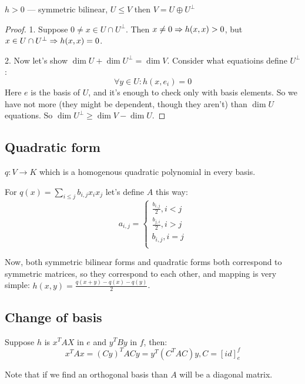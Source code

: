 \begin{thr}
    $h > 0$ --- symmetric bilinear, $U \le V$ then $V = U \oplus U^\perp$
\end{thr}
\begin{proof}

    1. Suppose $0 \ne x \in U \cap U^\perp$. Then $x \ne 0 \Rightarrow h(x, x) > 0$,
    but $x \in U \cap U^\perp \Rightarrow h(x, x) = 0$.

    2. Now let's show $\dim U + \dim U^\perp = \dim V$. Consider what equatioins define $U^\perp$:
    \[ \forall y \in U: h(x, e_i) = 0 \]
    Here $e$ is the basis of $U$, and it's enough to check only with basis elements.
    So we have not more (they might be dependent, though they aren't)
     than $\dim U$ equations. So $\dim U^\perp \ge \dim V - \dim U$.
\end{proof}

\subsection*{Quadratic form}
\begin{df} $q: V \to K$ which is a homogenous quadratic polynomial in every basis.\end{df}

For $q(x) = \sum\limits_{i\le j} b_{i,j}x_i x_j$ let's define $A$ this way:
\[ a_{i,j} = \begin{cases}
    \frac{b_{i,j}}{2}, i < j\\
    \frac{b_{j,i}}{2}, i > j\\
    b_{i,j}, i = j\\
\end{cases} \]

Now, both symmetric bilinear forms and quadratic forms both correspond to symmetric matrices,
so they correspond to each other, and mapping is very simple: $h(x, y) = \frac{q(x + y) - q(x) - q(y)}{2}$.

\subsection*{Change of basis}
Suppose $h$ is $x^T A X$ in $e$ and $y^T B y$ in $f$, then:
\[ x^T A x = (Cy)^T A Cy = y^T (C^T A C) y, C = [id]^f_e \] 

Note that if we find an orthogonal basis than $A$ will be a diagonal matrix.

